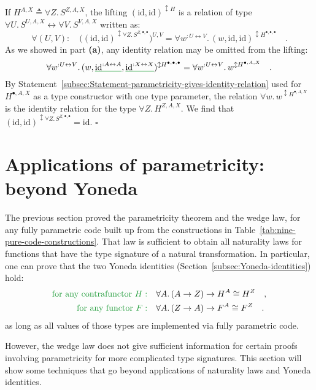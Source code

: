 If $H^{A,X}\triangleq\forall Z.\,S^{Z,A,X}$, the lifting $(\text{id},\text{id})^{\updownarrow H}$
is a relation of type $\forall U.\,S^{U,A,X}\leftrightarrow\forall V.\,S^{V,A,X}$
written as:
\[
\forall(U,V):\quad\big((\text{id},\text{id})^{\updownarrow\forall Z.\,S^{Z,\bullet,\bullet}}\big)^{U,V}=\forall w^{:U\leftrightarrow V}.\,(w,\text{id},\text{id})^{\updownarrow H^{\bullet,\bullet,\bullet}}\quad.
\]
As we showed in part \textbf{(a)}, any identity relation may be omitted
from the lifting:
\[
\forall w^{:U\leftrightarrow V}.\,(w,\gunderline{\text{id}^{:A\leftrightarrow A}},\gunderline{\text{id}^{:X\leftrightarrow X}})^{\updownarrow H^{\bullet,\bullet,\bullet}}=\forall w^{:U\leftrightarrow V}.\,w^{\updownarrow H^{\bullet,A,X}}\quad.
\]
By Statement~\ref{subsec:Statement-parametricity-gives-identity-relation}
used for $H^{\bullet,A,X}$ as a type constructor with one type parameter,
the relation $\forall w.\,w^{\updownarrow H^{\bullet,A,X}}$ is the
identity relation for the type $\forall Z.\,H^{Z,A,X}$. We find that
$(\text{id},\text{id})^{\updownarrow\forall Z.\,S^{Z,\bullet,\bullet}}=\text{id}$.
$\square$

\section{Applications of parametricity: beyond Yoneda\label{sec:Applications-of-parametricity:beyond-Yoneda}}

The previous section proved the parametricity theorem and the wedge
law, for any fully parametric code built up from the constructions
in Table~\ref{tab:nine-pure-code-constructions}. That law is sufficient
to obtain all naturality laws for functions that have the type signature
of a natural transformation. In particular, one can prove that the
two Yoneda identities (Section~\ref{subsec:Yoneda-identities}) hold:
\begin{align*}
{\color{greenunder}\text{for any contrafunctor }H:}\quad & \forall A.\,(A\rightarrow Z)\rightarrow H^{A}\cong H^{Z}\quad,\\
{\color{greenunder}\text{for any functor }F:}\quad & \forall A.\,(Z\rightarrow A)\rightarrow F^{A}\cong F^{Z}\quad.
\end{align*}
 as long as all values of those types are implemented via fully parametric
code.

However, the wedge law does not give sufficient information for certain
proofs involving parametricity for more complicated type signatures.
This section will show some techniques that go beyond applications
of naturality laws and Yoneda identities.

